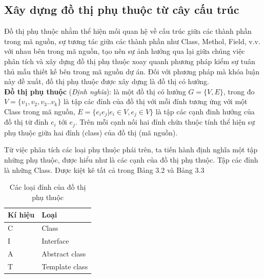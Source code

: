 \documentclass[12pt]{report}
\begin{document}
\subsection{Xây dựng đồ thị phụ thuộc từ cây cấu trúc}
Đồ thị phụ thuộc nhằm thể hiện mối quan hệ về cấu trúc giữa các thành phần trong mã nguồn, sự tương tác giữa các thành phần như Class, Methol, Field, v.v. với nhau bên trong mã nguồn, tạo nên sự ảnh hưởng qua lại giữa chúng
việc phân tích và xây dựng đồ thị phụ thuộc xoay quanh phương pháp kiểm sự tuân thủ mẫu thiết kế bên trong mã nguồn dự án.
Đối với phương pháp mà khóa luận này đề xuất, đồ thị phụ thuộc được xây dựng là đồ thị có hướng.\\
\noindent \textbf{Đồ thị phụ thuộc} (\textit{Định nghĩa}): là một đồ thị có hướng $G = \{V,E \}$, trong đo $V = \{v_1,v_2,v_3..v_k\}$ là tập các đỉnh của đồ thị với mỗi đỉnh tương ứng với một Class trong mã nguồn, $E = \{ e_ie_j | e_i \in V, e_j \in V  \}$ là tập các cạnh đinh hướng của đồ thị từ đỉnh $e_i$ tới $e_j$. Trên mỗi cạnh nối hai đỉnh chứa thuộc tính thể hiện sự phụ thuộc giữa hai đỉnh (class) của đồ thị (mã nguồn).

\noindent Từ việc phân tích các loại phụ thuộc phái trên, ta tiến hành định nghĩa một tập những phụ thuộc, được hiểu như là các cạnh của đồ thị phụ thuộc. Tập các đỉnh là những Class. Được kiệt kê tất cả trong Bảng 3.2 và Bảng 3.3 \cite{orucc2016}
\begin{table}[!htbp]
	\centering
	\caption{Các loại đỉnh của đồ thị phụ thuộc}
	\label{tbl:java-class-type}
	\renewcommand{\arraystretch}{0.7}
	\begin{tabular}{|p{2.7cm}|p{8.7cm}|}
		\hline
		\textbf{Kí hiệu} & \textbf{Loại} \\ \hline
		C				& Class\\ \hline
		I				& Interface \\ \hline
		A				& Abstract class \\ \hline
		T				& Template class \\ \hline         
	\end{tabular}
\end{table}
\end{document}
